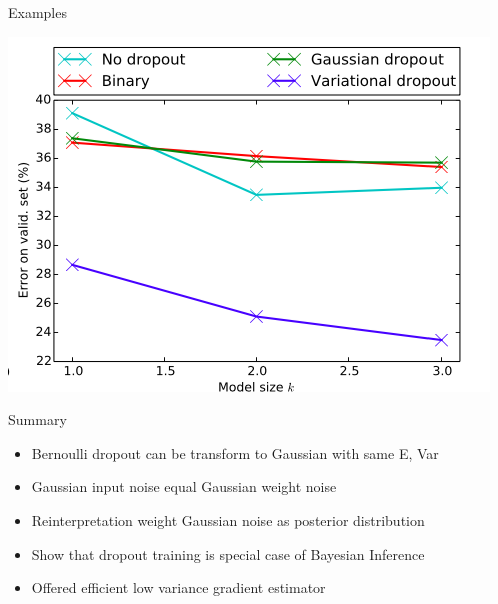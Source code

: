 \documentclass{beamer}
\begin{document}
\begin{frame}{Examples}
\begin{enumerate}
\begin{center}
				\includegraphics[scale=0.3]{img/cifar}
			\end{center}
	\end{enumerate}
\end{frame}

\begin{frame}{Summary}
	\begin{itemize}
		\item Bernoulli dropout can be transform to Gaussian with same E, Var
		\item Gaussian input noise equal Gaussian weight noise  
		\item Reinterpretation weight Gaussian noise as posterior distribution
		\item Show that dropout training is special case of Bayesian Inference
		\item Offered efficient low variance gradient estimator  
	\end{itemize}
\end{frame}
\end{document}
